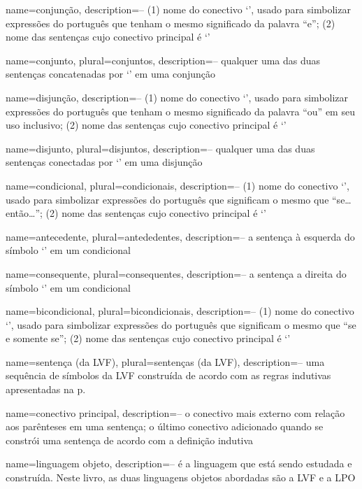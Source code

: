 {
name=conjunção,
description={-- (1) nome do conectivo `\eand', usado para simbolizar expressões do português que tenham o mesmo significado da palavra ``e''; (2) nome das sentenças cujo conectivo principal é `\eand'}
}

{
name=conjunto,
plural=conjuntos,
description={-- qualquer uma das duas sentenças concatenadas por `\eand' em uma conjunção}
}

{
name=disjunção,
description={-- (1) nome do conectivo `\eor', usado para simbolizar expressões do português que tenham o mesmo significado da palavra ``ou'' em seu uso inclusivo; (2) nome das sentenças cujo conectivo principal é `\eor'}
}

{
name=disjunto,
plural=disjuntos,
description={-- qualquer uma das duas sentenças conectadas por `\eor' em uma disjunção}
}

{
name=condicional,
plural=condicionais,
description={-- (1) nome do conectivo `\eif', usado para simbolizar expressões do português que significam o mesmo que ``se\ldots{}então\ldots''; (2) nome das sentenças cujo conectivo principal é `\eif'}
}

{
name=antecedente,
plural=antededentes,
description={-- a sentença à esquerda do símbolo `\eif' em um condicional}
}

{
name=consequente,
plural=consequentes,
description={-- a sentença a direita do símbolo `\eif' em um condicional}
}

{
name=bicondicional,
plural=bicondicionais,
description={-- (1) nome do conectivo `\eiff', usado para simbolizar expressões do português que significam o mesmo que ``se e somente se''; (2) nome das sentenças cujo conectivo principal é `\eiff'}
}

{
name=sentença (da LVF),
plural=sentenças (da LVF),
description={-- uma sequência de símbolos da LVF construída de acordo com as regras indutivas apresentadas na p.~\pageref{TFLsentences}}
}

{
name=conectivo principal,
description={-- o conectivo mais externo com relação aos parênteses em uma sentença; o último conectivo adicionado quando se constrói uma sentença de acordo com a definição indutiva}
}

{
name=linguagem objeto,
description={-- é a linguagem que está sendo estudada e construída. Neste livro, as duas linguagens objetos abordadas são a LVF e a LPO}
}

